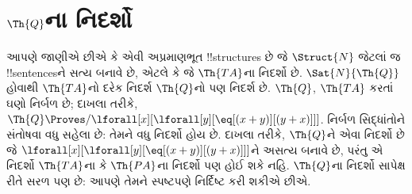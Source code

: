 \documentclass[../../../include/open-logic-section]{subfiles}
\begin{document}
\section{$\Th{Q}$ના નિદર્શો}

\begin{explain}
આપણે જાણીએ છીએ કે એવી અપ્રમાણભૂત !!{structure}s છે જે
$\Struct{N}$ જેટલાં જ !!{sentence}sને સત્ય બનાવે છે, એટલે કે જે
$\Th{TA}$ના નિદર્શો છે. $\Sat{N}{\Th{Q}}$ હોવાથી $\Th{TA}$નો દરેક
નિદર્શ $\Th{Q}$નો પણ નિદર્શ છે. $\Th{Q}$, $\Th{TA}$ કરતાં ઘણો
નિર્બળ છે; દાખલા તરીકે,
$\Th{Q}\Proves/\lforall[x][\lforall[y][\eq[(x+y)][(y+x)]]]$.
નિર્બળ સિદ્ધાંતોને સંતોષવા વધુ સહેલા છે: તેમને વધુ નિદર્શો હોય છે.
દાખલા તરીકે, $\Th{Q}$ને એવા નિદર્શો છે જે
$\lforall[x][\lforall[y][\eq[(x+y)][(y+x)]]]$ને અસત્ય બનાવે છે, પરંતુ
એ નિદર્શો $\Th{TA}$ના કે $\Th{PA}$ના નિદર્શો પણ હોઈ શકે નહિ.
$\Th{Q}$ના નિદર્શો સાપેક્ષ રીતે સરળ પણ છે: આપણે તેમને સ્પષ્ટપણે
નિર્દિષ્ટ કરી શકીએ છીએ.
\end{explain}
\end{document}
